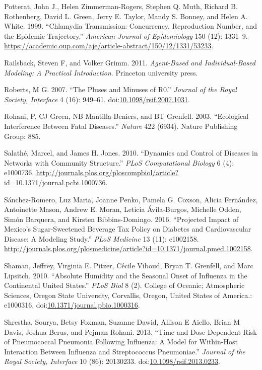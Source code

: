 \documentclass[]{book}
\theoremstyle{definition}
\theoremstyle{definition}
\theoremstyle{definition}
\theoremstyle{remark}
\begin{document}
\hypertarget{ref-potterat99}{}
Potterat, John J., Helen Zimmerman-Rogers, Stephen Q. Muth, Richard B.
Rothenberg, David L. Green, Jerry E. Taylor, Mandy S. Bonney, and Helen
A. White. 1999. ``Chlamydia Transmission: Concurrency, Reproduction
Number, and the Epidemic Trajectory.'' \emph{American Journal of
Epidemiology} 150 (12): 1331--9.
\url{https://academic.oup.com/aje/article-abstract/150/12/1331/53233}.

\hypertarget{ref-railsback11}{}
Railsback, Steven F, and Volker Grimm. 2011. \emph{Agent-Based and
Individual-Based Modeling: A Practical Introduction}. Princeton
university press.

\hypertarget{ref-roberts07}{}
Roberts, M G. 2007. ``The Pluses and Minuses of R0.'' \emph{Journal of
the Royal Society, Interface} 4 (16): 949--61.
doi:\href{https://doi.org/10.1098/rsif.2007.1031}{10.1098/rsif.2007.1031}.

\hypertarget{ref-rohani03}{}
Rohani, P, CJ Green, NB Mantilla-Beniers, and BT Grenfell. 2003.
``Ecological Interference Between Fatal Diseases.'' \emph{Nature} 422
(6934). Nature Publishing Group: 885.

\hypertarget{ref-salathe10}{}
Salathé, Marcel, and James H. Jones. 2010. ``Dynamics and Control of
Diseases in Networks with Community Structure.'' \emph{PLoS
Computational Biology} 6 (4): e1000736.
\url{http://journals.plos.org/ploscompbiol/article?id=10.1371/journal.pcbi.1000736}.

\hypertarget{ref-sanchez-romero16}{}
Sánchez-Romero, Luz Maria, Joanne Penko, Pamela G. Coxson, Alicia
Fernández, Antoinette Mason, Andrew E. Moran, Leticia Ávila-Burgos,
Michelle Odden, Simón Barquera, and Kirsten Bibbins-Domingo. 2016.
``Projected Impact of Mexico's Sugar-Sweetened Beverage Tax Policy on
Diabetes and Cardiovascular Disease: A Modeling Study.'' \emph{PLoS
Medicine} 13 (11): e1002158.
\url{http://journals.plos.org/plosmedicine/article?id=10.1371/journal.pmed.1002158}.

\hypertarget{ref-shaman10}{}
Shaman, Jeffrey, Virginia E. Pitzer, Cécile Viboud, Bryan T. Grenfell,
and Marc Lipsitch. 2010. ``Absolute Humidity and the Seasonal Onset of
Influenza in the Continental United States.'' \emph{PLoS Biol} 8 (2).
College of Oceanic; Atmospheric Sciences, Oregon State University,
Corvallis, Oregon, United States of America.: e1000316.
doi:\href{https://doi.org/10.1371/journal.pbio.1000316}{10.1371/journal.pbio.1000316}.

\hypertarget{ref-shrestha13}{}
Shrestha, Sourya, Betsy Foxman, Suzanne Dawid, Allison E Aiello, Brian M
Davis, Joshua Berus, and Pejman Rohani. 2013. ``Time and Dose-Dependent
Risk of Pneumococcal Pneumonia Following Influenza: A Model for
Within-Host Interaction Between Influenza and Streptococcus
Pneumoniae.'' \emph{Journal of the Royal Society, Interface} 10 (86):
20130233.
doi:\href{https://doi.org/10.1098/rsif.2013.0233}{10.1098/rsif.2013.0233}.
\end{document}
